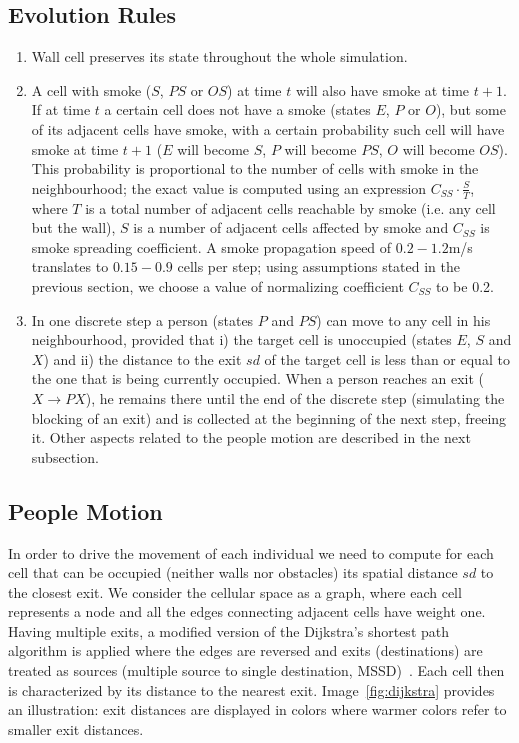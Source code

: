 \subsection{Evolution Rules}
\begin{enumerate}
    \item Wall cell preserves its state throughout the whole simulation.

    \item A cell with smoke ($S$, $PS$ or $OS$) at time $t$ will also have smoke
    at time $t+1$.
    If at time $t$ a certain cell does not have a smoke (states $E$, $P$ or
    $O$), but some of its adjacent cells have smoke, with a certain probability
    such cell will have smoke at time $t+1$ ($E$ will become $S$, $P$ will
    become $PS$, $O$ will become $OS$).
    This probability is proportional to the number of cells with smoke in the
    neighbourhood; the exact value is computed using an expression
    $C_{SS} \cdot \frac{S}{T}$, where $T$ is a total number of adjacent
    cells reachable by smoke (i.e. any cell but the wall), $S$ is a number
    of adjacent cells affected by smoke and $C_{SS}$ is smoke spreading
    coefficient.
    A smoke propagation speed of $0.2-1.2$m/s translates to $0.15-0.9$ cells
    per step; using assumptions stated in the previous section, we choose a
    value of normalizing coefficient $C_{SS}$ to be 0.2.
    
    \item In one discrete step a person (states $P$ and $PS$) can move to
    any cell in his neighbourhood, provided that i) the target cell is
    unoccupied (states $E$, $S$ and $X$) and ii) the distance to the exit
    $sd$ of the target cell is less than or equal to the one that is being
    currently occupied.
    When a person reaches an exit ($X \rightarrow PX$), he remains there until
    the end of the discrete step (simulating the blocking of an exit) and is
    collected at the beginning of the next step, freeing it.
    Other aspects related to the people motion are described in the next
    subsection.
\end{enumerate}

\subsection{People Motion}
In order to drive the movement of each individual we need to compute for each
cell that can be occupied (neither walls nor obstacles) its spatial distance
$sd$ to the closest exit.
We consider the cellular space as a graph, where each cell represents a node and
all the edges connecting adjacent cells have weight one.
Having multiple exits, a modified version of the Dijkstra's shortest path
algorithm is applied where the edges are reversed and exits (destinations) are
treated as sources (multiple source to single destination, MSSD)~\cite{Dijkstra}.
Each cell then is characterized by its distance to the nearest exit.
Image~\ref{fig:dijkstra} provides an illustration: exit distances are
displayed in colors where warmer colors refer to smaller exit distances.

